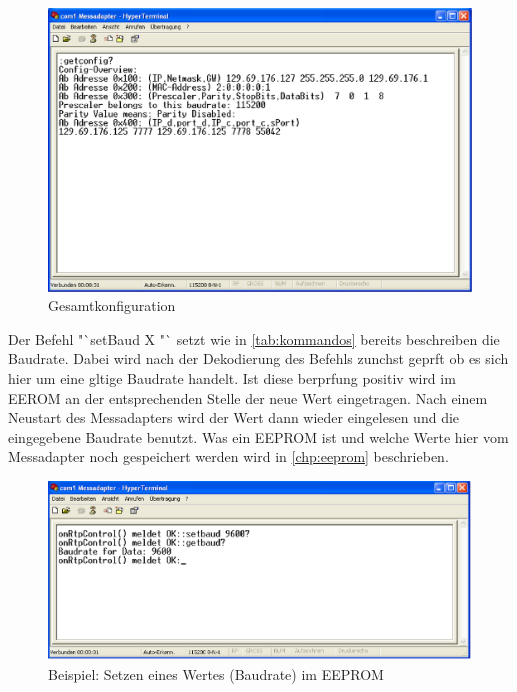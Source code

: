 \documentclass[a4paper]{book}%
\begin{document}
\vspace{1 cm}

\begin{figure}[H]
	\centering
	\includegraphics[width=1.0\textwidth]{figures/getconfig.eps}
	\caption{Gesamtkonfiguration}
	\label{fig:getconfig}
\end{figure}

\vspace{1 cm}

Der Befehl "`setBaud X "` setzt wie in \ref{tab:kommandos} bereits beschreiben die Baudrate. Dabei wird nach der Dekodierung des Befehls zunchst
geprft ob es sich hier um eine gltige Baudrate handelt. Ist diese berprfung positiv wird im EEROM an der entsprechenden Stelle der neue Wert
eingetragen. Nach einem Neustart des Messadapters wird der Wert dann wieder eingelesen und die eingegebene Baudrate benutzt.
Was ein EEPROM ist und welche Werte hier vom Messadapter noch gespeichert werden wird in \ref{chp:eeprom} beschrieben.

\vspace{1 cm}
\begin{figure}[H]
	\centering
	\includegraphics[width=1.0\textwidth]{figures/setbaud.eps}
	\caption{Beispiel: Setzen eines Wertes (Baudrate) im EEPROM}
	\label{fig:setBaud}
\end{figure}
\vspace{1 cm}
\end{document}
